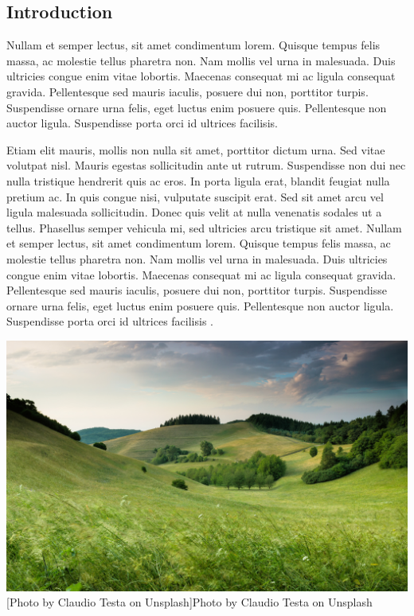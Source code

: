 \begin{multicols}{2}


\section{Introduction}

Nullam et semper lectus, sit amet condimentum lorem. Quisque tempus felis massa, ac molestie tellus pharetra non. Nam mollis vel urna in malesuada. Duis ultricies congue enim vitae lobortis. Maecenas consequat mi ac ligula consequat gravida. Pellentesque sed mauris iaculis, posuere dui non, porttitor turpis. Suspendisse ornare urna felis, eget luctus enim posuere quis. Pellentesque non auctor ligula. Suspendisse porta orci id ultrices facilisis.

Etiam elit mauris, mollis non nulla sit amet, porttitor dictum urna. Sed vitae volutpat nisl. Mauris egestas sollicitudin ante ut rutrum. Suspendisse non dui nec nulla tristique hendrerit quis ac eros. In porta ligula erat, blandit feugiat nulla pretium ac. In quis congue nisi, vulputate suscipit erat. Sed sit amet arcu vel ligula malesuada sollicitudin. Donec quis velit at nulla venenatis sodales ut a tellus. Phasellus semper vehicula mi, sed ultricies arcu tristique sit amet. Nullam et semper lectus, sit amet condimentum lorem. Quisque tempus felis massa, ac molestie tellus pharetra non. Nam mollis vel urna in malesuada. Duis ultricies congue enim vitae lobortis. Maecenas consequat mi ac ligula consequat gravida. Pellentesque sed mauris iaculis, posuere dui non, porttitor turpis. Suspendisse ornare urna felis, eget luctus enim posuere quis. Pellentesque non auctor ligula. Suspendisse porta orci id ultrices facilisis \citep{heistermann_technical_2013}.

\noindent
\begin{minipage}[h]{0.45\textwidth}
\includegraphics[width=\columnwidth]{./Figures/image2.jpg}
[Photo by Claudio Testa on Unsplash]{Photo by Claudio Testa on Unsplash} 
\label{fig:image2}
\end{minipage}


\end{multicols}
